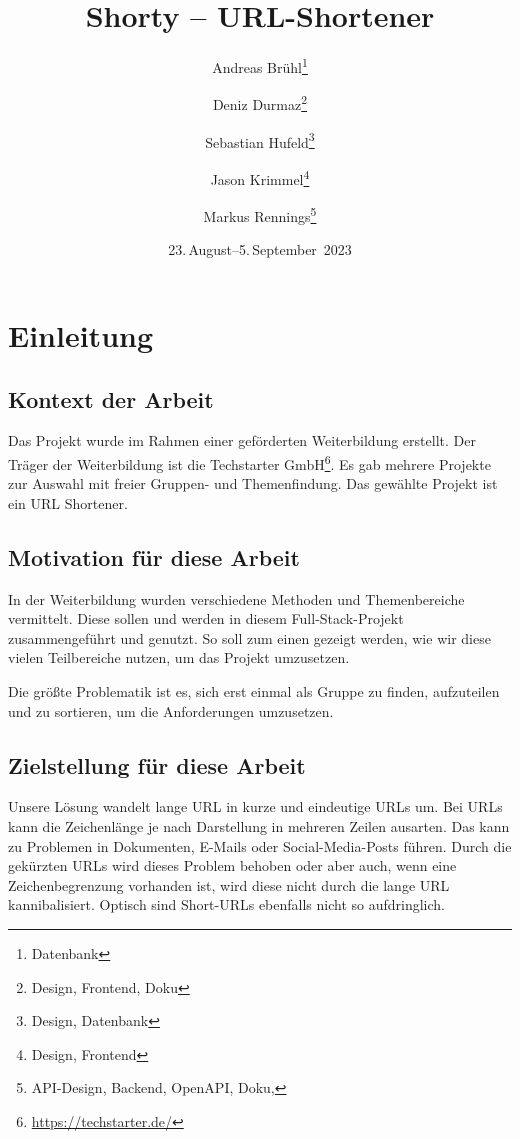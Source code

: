 \documentclass[a4paper,11pt,DIV=12,overfullrule=on]{scrreprt}%
\title{Shorty – URL-Shortener}
\subtitle{}
\author{Andreas Brühl\thanks{Datenbank} \and Deniz Durmaz\thanks{Design, Frontend, Doku} \and Sebastian Hufeld\thanks{Design, Datenbank} \and Jason Krimmel\thanks{Design, Frontend} \and Markus Rennings\thanks{API-Design, Backend, OpenAPI, Doku, \XeLaTeX}}
\date{23.\,August–5.\,September~2023}
\begin{document}
\maketitle

\tableofcontents

\chapter{Einleitung}
\section{Kontext der Arbeit}
Das Projekt wurde im Rahmen einer geförderten Weiterbildung erstellt. Der Träger der Weiterbildung ist die Techstarter GmbH\footnote{\href{https://techstarter.de/}{https://techstarter.de/}}. Es gab mehrere Projekte zur Auswahl mit freier Gruppen- und Themenfindung. Das gewählte Projekt ist ein URL Shortener.

\section{Motivation für diese Arbeit}
In der Weiterbildung wurden verschiedene Methoden und Themenbereiche vermittelt. Diese sollen und werden in diesem Full-Stack-Projekt zusammengeführt und genutzt. So soll zum einen gezeigt werden, wie wir diese vielen Teilbereiche nutzen, um das Projekt umzusetzen.

Die größte Problematik ist es, sich erst einmal als Gruppe zu finden, aufzuteilen und zu sortieren, um die Anforderungen umzusetzen.

\section{Zielstellung für diese Arbeit}
Unsere Lösung wandelt lange \ac{URL} in kurze und eindeutige \ac{URL}s um. Bei \ac{URL}s kann die Zeichenlänge je nach Darstellung in mehreren Zeilen ausarten. Das kann zu Problemen in Dokumenten, E-Mails oder Social-Media-Posts führen. Durch die gekürzten \ac{URL}s wird dieses Problem behoben oder aber auch, wenn eine Zeichenbegrenzung vorhanden ist, wird diese nicht durch die lange \ac{URL} kannibalisiert. Optisch sind Short-\ac{URL}s ebenfalls nicht so aufdringlich.
\end{document}
